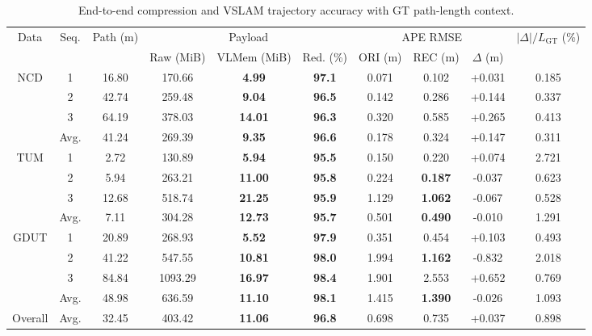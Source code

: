 \begin{table}[!t]
\renewcommand{\arraystretch}{1.14}
\caption{End-to-end compression and VSLAM trajectory accuracy with GT path-length context.}
\label{tab:compression_accuracy}
\centering
\footnotesize
\setlength{\tabcolsep}{2pt}
\begin{tabular*}{\textwidth}{@{\extracolsep{\fill}}cc*{8}{c}@{}}
\toprule
\multirow{2}{*}{Data} & \multirow{2}{*}{Seq.} & \multirow{2}{*}{Path (m)} & \multicolumn{3}{c}{Payload} & \multicolumn{3}{c}{APE RMSE} & \multirow{2}{*}{$|\Delta|/L_{\mathrm{GT}}$ (\%)} \\
\cmidrule(lr){4-6}\cmidrule(lr){7-9}
 & & & Raw (MiB) & VLMem (MiB) & Red. (\%) & ORI (m) & REC (m) & $\Delta$ (m) & \\
\midrule
\multirow{4}{*}{NCD} & 1 & 16.80 & 170.66 & \textbf{4.99} & \textbf{97.1} & 0.071 & 0.102 & +0.031 & 0.185 \\
 & 2 & 42.74 & 259.48 & \textbf{9.04} & \textbf{96.5} & 0.142 & 0.286 & +0.144 & 0.337 \\
 & 3 & 64.19 & 378.03 & \textbf{14.01} & \textbf{96.3} & 0.320 & 0.585 & +0.265 & 0.413 \\
 & Avg. & 41.24 & 269.39 & \textbf{9.35} & \textbf{96.6} & 0.178 & 0.324 & +0.147 & 0.311 \\
\midrule
\multirow{4}{*}{TUM} & 1 & 2.72 & 130.89 & \textbf{5.94} & \textbf{95.5} & 0.150 & 0.220 & +0.074 & 2.721 \\
 & 2 & 5.94 & 263.21 & \textbf{11.00} & \textbf{95.8} & 0.224 & \textbf{0.187} & -0.037 & 0.623 \\
 & 3 & 12.68 & 518.74 & \textbf{21.25} & \textbf{95.9} & 1.129 & \textbf{1.062} & -0.067 & 0.528 \\
 & Avg. & 7.11 & 304.28 & \textbf{12.73} & \textbf{95.7} & 0.501 & \textbf{0.490} & -0.010 & 1.291 \\
\midrule
\multirow{4}{*}{GDUT} & 1 & 20.89 & 268.93 & \textbf{5.52} & \textbf{97.9} & 0.351 & 0.454 & +0.103 & 0.493 \\
 & 2 & 41.22 & 547.55 & \textbf{10.81} & \textbf{98.0} & 1.994 & \textbf{1.162} & -0.832 & 2.018 \\
 & 3 & 84.84 & 1093.29 & \textbf{16.97} & \textbf{98.4} & 1.901 & 2.553 & +0.652 & 0.769 \\
 & Avg. & 48.98 & 636.59 & \textbf{11.10} & \textbf{98.1} & 1.415 & \textbf{1.390} & -0.026 & 1.093 \\
\midrule
Overall & Avg. & 32.45 & 403.42 & \textbf{11.06} & \textbf{96.8} & 0.698 & 0.735 & +0.037 & 0.898 \\

\end{tabular*}
\end{table}
